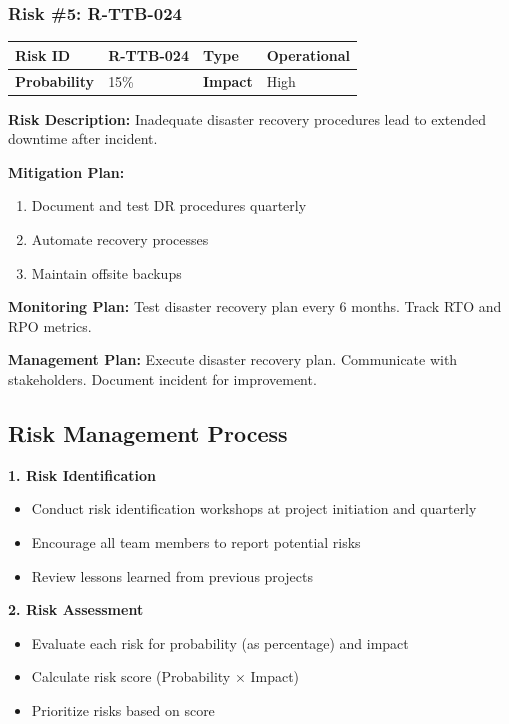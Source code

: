 \subsubsection{Risk \#5: R-TTB-024}

\begin{table}[h]
\small
\begin{tabular}{|p{3cm}|p{3cm}|p{3cm}|p{3cm}|}
\hline
\textbf{Risk ID} & R-TTB-024 & \textbf{Type} & Operational \\
\hline
\textbf{Probability} & 15\% & \textbf{Impact} & High \\
\hline
\end{tabular}
\end{table}

\textbf{Risk Description:} Inadequate disaster recovery procedures lead to extended downtime after incident.

\textbf{Mitigation Plan:}
\begin{enumerate}[leftmargin=*]
    \item Document and test DR procedures quarterly
    \item Automate recovery processes
    \item Maintain offsite backups
\end{enumerate}

\textbf{Monitoring Plan:} Test disaster recovery plan every 6 months. Track RTO and RPO metrics.

\textbf{Management Plan:} Execute disaster recovery plan. Communicate with stakeholders. Document incident for improvement.

\subsection{Risk Management Process}

\textbf{1. Risk Identification}
\begin{itemize}[leftmargin=*]
    \item Conduct risk identification workshops at project initiation and quarterly
    \item Encourage all team members to report potential risks
    \item Review lessons learned from previous projects
\end{itemize}

\textbf{2. Risk Assessment}
\begin{itemize}[leftmargin=*]
    \item Evaluate each risk for probability (as percentage) and impact
    \item Calculate risk score (Probability × Impact)
    \item Prioritize risks based on score
\end{itemize}


